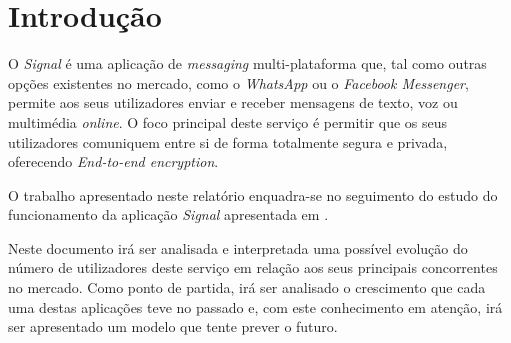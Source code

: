 \section{Introdução}

O \textit{Signal} é uma aplicação de \textit{messaging} multi-plataforma que, tal como outras opções existentes no mercado, como o \textit{WhatsApp} ou o \textit{Facebook Messenger}, permite aos seus utilizadores enviar e receber mensagens de texto, voz ou multimédia \textit{online}. O foco principal deste serviço é permitir que os seus utilizadores comuniquem entre si de forma totalmente segura e privada, oferecendo \textit{End-to-end encryption}.

O trabalho apresentado neste relatório enquadra-se no seguimento do estudo do funcionamento da aplicação \textit{Signal} apresentada em \cite{past_report}.

Neste documento irá ser analisada e interpretada uma possível evolução do número de utilizadores deste serviço em relação aos seus principais concorrentes no mercado. Como ponto de partida, irá ser analisado o crescimento que cada uma destas aplicações teve no passado e, com este conhecimento em atenção, irá ser apresentado um modelo que tente prever o futuro. 
